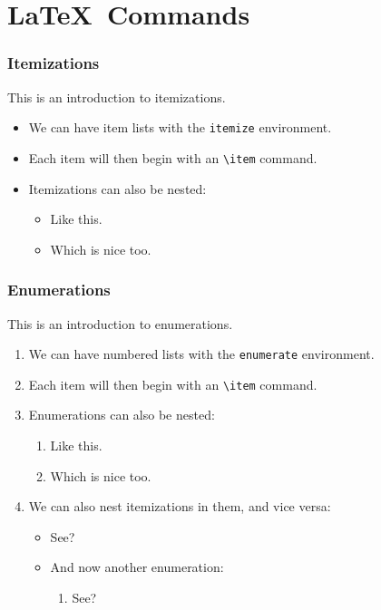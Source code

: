 \documentclass[mathserif]{beamer}%
\begin{document}
\section{\LaTeX\ Commands}%
%
\begin{frame}%
\frametitle{Itemizations}%
This is an introduction to itemizations.%
\begin{itemize}%
\item We can have item lists with the \texttt{itemize} environment.%
\item Each item will then begin with an \texttt{{\textbackslash}item} command.%
\item Itemizations can also be nested:%
\begin{itemize}%
\item Like this.%
\item Which is nice too.
\end{itemize}%
\end{itemize}%
\end{frame}%
%
\begin{frame}%
\frametitle{Enumerations}%
This is an introduction to enumerations.%
\begin{enumerate}%
\item We can have numbered lists with the \texttt{enumerate} environment.%
\item Each item will then begin with an \texttt{{\textbackslash}item} command.%
\item Enumerations can also be nested:%
\begin{enumerate}%
\item Like this.%
\item Which is nice too.
\end{enumerate}%
\item We can also nest itemizations in them, and vice versa:%
\begin{itemize}%
\item See?%
\item And now another enumeration:%
\begin{enumerate}%
\item See?
\end{enumerate}%
\end{itemize}%
\end{enumerate}%
\end{frame}%
%
\end{document}
